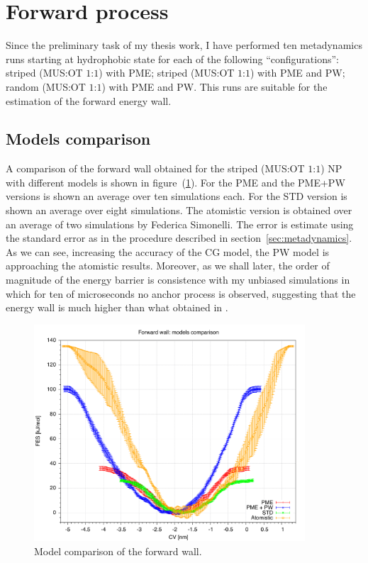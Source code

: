 \section{Forward process}
Since the preliminary task of my thesis work, I have performed ten metadynamics runs starting at hydrophobic state for each of the following ``configurations'': striped (\ac{MUS}:\ac{OT} $1$:$1$) with \ac{PME}; striped (\ac{MUS}:\ac{OT} $1$:$1$) with \ac{PME} and \ac{PW}; random (\ac{MUS}:\ac{OT} $1$:$1$) with \ac{PME} and \ac{PW}. This runs are suitable for the estimation of the forward energy wall.
 
\subsection{Models comparison}
A comparison of the forward wall obtained for the striped (\ac{MUS}:\ac{OT} $1$:$1$) \ac{NP} with different models is shown in figure~(\ref{fig:forwardWall}). For the \ac{PME} and the \ac{PME}+\ac{PW} versions is shown an average over ten simulations each. For the STD version is shown an average over eight simulations. The atomistic version is obtained over an average of two simulations by Federica Simonelli. The error is estimate using the standard error as in the procedure described in section~\ref{sec:metadynamics}. As we can see, increasing the accuracy of the \ac{CG} model, the \ac{PW} model is approaching the atomistic results. Moreover, as we shall later, the order of magnitude of the energy barrier is consistence with my unbiased simulations in which for ten of microseconds no anchor process is observed, suggesting that the energy wall is much higher than what obtained in \cite{ourPaper}. 
\begin{figure}[h!t]
	\centering
	\includegraphics[width=0.9\textwidth]{./img/results/FESModelComparison/forwardWall}
	\caption{Model comparison of the forward wall.}
	\label{fig:forwardWall}
\end{figure}

